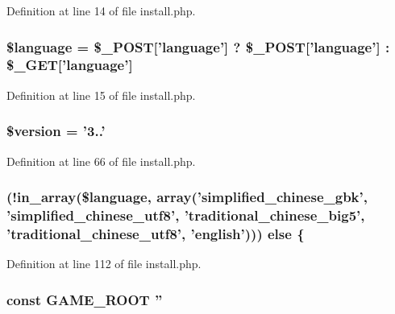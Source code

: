 Definition at line 14 of file install.\+php.

\hypertarget{install_8php_a83170d318260a5a2e2a79dccdd371b10}{
\subsubsection[{\$language}]{\setlength{\rightskip}{0pt plus 5cm}\${\bf language} = \$\+\_\+\+P\+O\+S\+T\mbox{[}'{\bf language}'\mbox{]} ? \$\+\_\+\+P\+O\+S\+T\mbox{[}'{\bf language}'\mbox{]} \+: \$\+\_\+\+G\+E\+T\mbox{[}'{\bf language}'\mbox{]}}}\label{install_8php_a83170d318260a5a2e2a79dccdd371b10}


Definition at line 15 of file install.\+php.

\hypertarget{install_8php_a17c8948c68aa44fa9961ae169b6a8961}{
\subsubsection[{\$version}]{\setlength{\rightskip}{0pt plus 5cm}\$version = '3..'}}\label{install_8php_a17c8948c68aa44fa9961ae169b6a8961}


Definition at line 66 of file install.\+php.

\hypertarget{install_8php_afadbcec73e75eda2ede71036df8ae97c}{
\subsubsection[{else}]{ (!in\+\_\+array(\${\bf language}, array('simplified\+\_\+chinese\+\_\+gbk', 'simplified\+\_\+chinese\+\_\+utf8', 'traditional\+\_\+chinese\+\_\+big5', 'traditional\+\_\+chinese\+\_\+utf8', 'english'))) else \{}}\label{install_8php_afadbcec73e75eda2ede71036df8ae97c}


Definition at line 112 of file install.\+php.

\hypertarget{install_8php_a8e43cd27c8e744fff590983bc396aba3}{
\subsubsection[{G\+A\+M\+E\+\_\+\+R\+O\+O\+T}]{\setlength{\rightskip}{0pt plus 5cm}const G\+A\+M\+E\+\_\+\+R\+O\+O\+T ''}}\label{install_8php_a8e43cd27c8e744fff590983bc396aba3}


